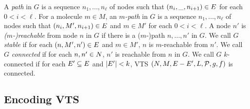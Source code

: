 
%

A {\em path} in $G$ is a sequence $n_1,...,n_\ell$ of nodes 
such that $(n_i,\_,n_{i+1}) \in E$ for each $ 0 < i < \ell$.
%
For a molecule $m \in M$,
an {\em $m$-path} in $G$ is a sequence $n_1,...,n_\ell$ of nodes 
such that $(n_i,M',n_{i+1}) \in E$ and $m \in M'$ for
each $ 0 < i < \ell$.
%
A node $n'$ is {\em ($m$-)reachable} from node $n$ in $G$ if there is a ($m$-)path
$n,...,n'$ in $G$.
%
%
We call $G$ {\em stable} if for each $(n,M',n') \in E$ and $m \in M'$,
$n$ is $m$-reachable from $n'$.
%
We call $G$ {\em connected} if for each $n,n' \in N$,
$n'$ is reachable from $n$ in $G$.
%
We call $G$ $k$-connected if for each $E' \subseteq E$ and $|E'| < k$,
VTS $(N,M,E-E',L,\mathcal{P},g,f)$ is connected.



%


\subsection{Encoding VTS}

